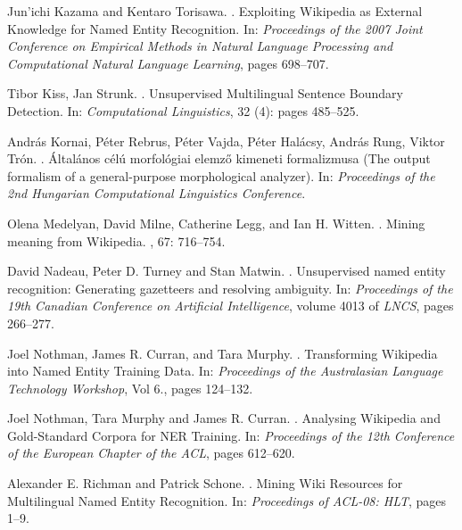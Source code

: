 \documentclass[11pt]{article}
\begin{document}
\begin{thebibliography}{}
Jun'ichi Kazama and Kentaro Torisawa.
.
\newblock Exploiting Wikipedia as External Knowledge for Named Entity Recognition.
\newblock In: {\em Proceedings of the 2007 Joint Conference on Empirical Methods in Natural Language Processing and Computational Natural Language Learning}, pages 698--707.

Tibor Kiss, Jan Strunk.
.
\newblock Unsupervised Multilingual Sentence Boundary Detection. 
\newblock In: {\em Computational Linguistics}, 32 (4): pages 485--525.

András Kornai, Péter Rebrus, Péter Vajda, Péter Halácsy, András Rung, Viktor Trón.
.
\newblock Általános célú morfológiai elemző kimeneti formalizmusa (The output formalism of a general-purpose morphological analyzer).
\newblock In: {\em Proceedings of the 2nd Hungarian Computational Linguistics Conference}.

Olena Medelyan, David Milne, Catherine Legg, and Ian H. Witten.
.
\newblock Mining meaning from Wikipedia.
, 67: 716--754.

David Nadeau, Peter D. Turney and Stan Matwin.
.
\newblock Unsupervised named entity recognition: Generating gazetteers and resolving ambiguity. 
\newblock In: {\em Proceedings of the 19th Canadian Conference on Artificial Intelligence}, volume 4013 of {\em LNCS}, pages 266--277.

Joel Nothman, James R. Curran, and Tara Murphy.
.
\newblock Transforming Wikipedia into Named Entity Training Data.
\newblock In: {\em Proceedings of the Australasian Language Technology Workshop}, Vol 6., pages 124--132.

Joel Nothman, Tara Murphy and James R. Curran.
.
\newblock Analysing Wikipedia and Gold-Standard Corpora for NER Training.
\newblock In: {\em Proceedings of the 12th Conference of the European Chapter of the ACL}, pages 612--620.

Alexander E. Richman and Patrick Schone.
.
\newblock Mining Wiki Resources for Multilingual Named Entity Recognition.
\newblock In: {\em Proceedings of ACL-08: HLT}, pages 1--9.


\end{thebibliography}
\end{document}
